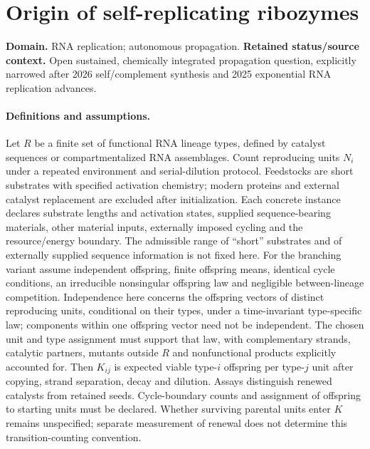\documentclass[11pt]{article}
\begin{document}
\section*{Origin of self-replicating ribozymes}
\label{prob:287}
\label{rank:190}
\par\smallskip

\noindent\textbf{Domain.} RNA replication; autonomous propagation. \quad \textbf{Retained status/source context.} Open sustained, chemically integrated propagation question, explicitly narrowed after 2026 self/complement synthesis and 2025 exponential RNA replication advances.

\paragraph{Definitions and assumptions.} Let $R$ be a finite set of functional RNA lineage types, defined by catalyst sequences or compartmentalized RNA assemblages. Count reproducing units $N_i$ under a repeated environment and serial-dilution protocol. Feedstocks are short substrates with specified activation chemistry; modern proteins and external catalyst replacement are excluded after initialization. Each concrete instance declares substrate lengths and activation states, supplied sequence-bearing materials, other material inputs, externally imposed cycling and the resource/energy boundary. The admissible range of ``short'' substrates and of externally supplied sequence information is not fixed here. For the branching variant assume independent offspring, finite offspring means, identical cycle conditions, an irreducible nonsingular offspring law and negligible between-lineage competition. Independence here concerns the offspring vectors of distinct reproducing units, conditional on their types, under a time-invariant type-specific law; components within one offspring vector need not be independent. The chosen unit and type assignment must support that law, with complementary strands, catalytic partners, mutants outside $R$ and nonfunctional products explicitly accounted for. Then $K_{ij}$ is expected viable type-$i$ offspring per type-$j$ unit after copying, strand separation, decay and dilution. Assays distinguish renewed catalysts from retained seeds. Cycle-boundary counts and assignment of offspring to starting units must be declared. Whether surviving parental units enter $K$ remains unspecified; separate measurement of renewal does not determine this transition-counting convention.
\end{document}
